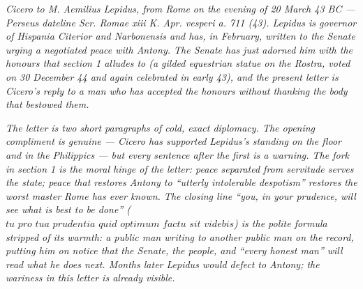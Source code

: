 
\textit{Cicero to M. Aemilius Lepidus, from Rome on the
evening of 20 March 43 BC --- Perseus dateline
\textit{Scr. Romae xiii K. Apr. vesperi a. 711 (43)}.
Lepidus is governor of Hispania Citerior and
Narbonensis and has, in February, written to the
Senate urging a negotiated peace with Antony. The
Senate has just adorned him with the honours that
section 1 alludes to (a gilded equestrian statue on
the Rostra, voted on 30 December 44 and again
celebrated in early 43), and the present letter is
Cicero's reply to a man who has accepted the honours
without thanking the body that bestowed them.}

\textit{The letter is two short paragraphs of cold,
exact diplomacy. The opening compliment is genuine ---
Cicero has supported Lepidus's standing on the floor
and in the Philippics --- but every sentence after the
first is a warning. The fork in section 1 is the moral
hinge of the letter: peace separated from servitude
serves the state; peace that restores Antony to
``utterly intolerable despotism'' restores the worst
master Rome has ever known. The closing line ``you, in
your prudence, will see what is best to be done''
($\textit{tu pro tua prudentia quid optimum factu sit
videbis}$) is the polite formula stripped of its
warmth: a public man writing to another public man on
the record, putting him on notice that the Senate, the
people, and ``every honest man'' will read what he
does next. Months later Lepidus would defect to
Antony; the wariness in this letter is already
visible.}

